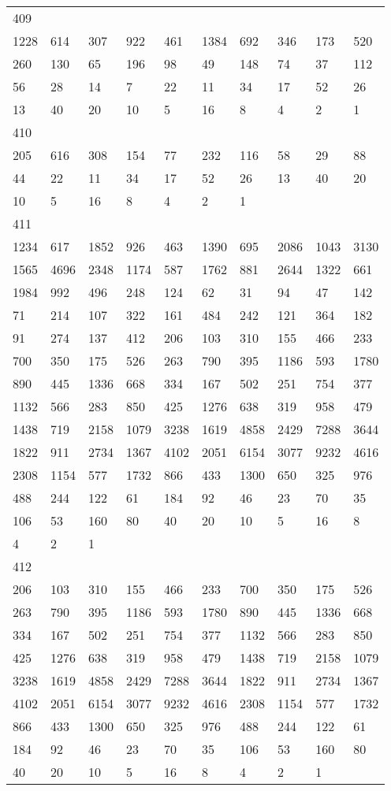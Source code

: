 \begin{longtable}{*{10}{l}}
409&&&&&&&&&\\
1228& 614& 307& 922& 461& 1384& 692& 346& 173& 520\\
260& 130& 65& 196& 98& 49& 148& 74& 37& 112\\
56& 28& 14& 7& 22& 11& 34& 17& 52& 26\\
13& 40& 20& 10& 5& 16& 8& 4& 2& 1\\

410&&&&&&&&&\\
205& 616& 308& 154& 77& 232& 116& 58& 29& 88\\
44& 22& 11& 34& 17& 52& 26& 13& 40& 20\\
10& 5& 16& 8& 4& 2& 1& \\

411&&&&&&&&&\\
1234& 617& 1852& 926& 463& 1390& 695& 2086& 1043& 3130\\
1565& 4696& 2348& 1174& 587& 1762& 881& 2644& 1322& 661\\
1984& 992& 496& 248& 124& 62& 31& 94& 47& 142\\
71& 214& 107& 322& 161& 484& 242& 121& 364& 182\\
91& 274& 137& 412& 206& 103& 310& 155& 466& 233\\
700& 350& 175& 526& 263& 790& 395& 1186& 593& 1780\\
890& 445& 1336& 668& 334& 167& 502& 251& 754& 377\\
1132& 566& 283& 850& 425& 1276& 638& 319& 958& 479\\
1438& 719& 2158& 1079& 3238& 1619& 4858& 2429& 7288& 3644\\
1822& 911& 2734& 1367& 4102& 2051& 6154& 3077& 9232& 4616\\
2308& 1154& 577& 1732& 866& 433& 1300& 650& 325& 976\\
488& 244& 122& 61& 184& 92& 46& 23& 70& 35\\
106& 53& 160& 80& 40& 20& 10& 5& 16& 8\\
4& 2& 1& \\

412&&&&&&&&&\\
206& 103& 310& 155& 466& 233& 700& 350& 175& 526\\
263& 790& 395& 1186& 593& 1780& 890& 445& 1336& 668\\
334& 167& 502& 251& 754& 377& 1132& 566& 283& 850\\
425& 1276& 638& 319& 958& 479& 1438& 719& 2158& 1079\\
3238& 1619& 4858& 2429& 7288& 3644& 1822& 911& 2734& 1367\\
4102& 2051& 6154& 3077& 9232& 4616& 2308& 1154& 577& 1732\\
866& 433& 1300& 650& 325& 976& 488& 244& 122& 61\\
184& 92& 46& 23& 70& 35& 106& 53& 160& 80\\
40& 20& 10& 5& 16& 8& 4& 2& 1& \\


\end{longtable}
